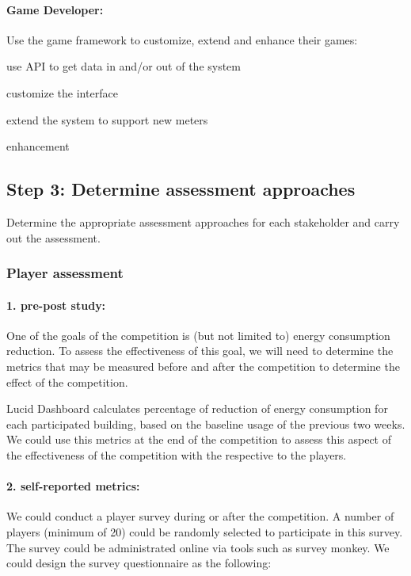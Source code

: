 \documentclass[11pt]{article}
\begin{document}
\paragraph{Game Developer:} Use the game framework to customize, extend and enhance their games:
    \begin{compactitem}
    \item use API to get data in and/or out of the system
    \item customize the interface
    \item extend the system to support new meters
    \item enhancement
    \end{compactitem}
    
\subsection{Step 3: Determine assessment approaches}
 Determine the appropriate assessment approaches for each stakeholder and carry out the assessment.

\subsubsection{Player assessment}
 
\paragraph{1. pre-post study:}

One of the goals of the competition is (but not limited to) energy consumption reduction. To assess the effectiveness of this goal, we will need to determine the metrics that may be measured before and 
after the competition to determine the effect of the competition.

Lucid Dashboard calculates percentage of reduction of energy consumption for each participated building, based on the baseline usage of the previous two weeks. 
We could use this metrics at the end of the competition to assess this aspect of the effectiveness of the competition with the respective to the players.
    
\paragraph{2. self-reported metrics: } 

We could conduct a player survey during or after the competition. A number of players (minimum of 20) could be randomly selected to participate in this survey. The survey could be administrated online via tools such as survey monkey. We could design the survey questionnaire as the following:
    
\end{document}
